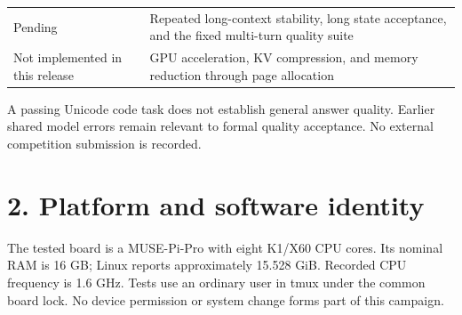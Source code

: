 \documentclass[10pt,a4paper]{article}
\begin{document}
\begin{longtable}[]{@{}ll@{}}
\begin{minipage}[t]{0.47\columnwidth}
Pending\strut
\end{minipage} & \begin{minipage}[t]{0.47\columnwidth}\raggedright
Repeated long-context stability, long state acceptance, and the fixed
multi-turn quality suite\strut
\end{minipage}\tabularnewline
\begin{minipage}[t]{0.47\columnwidth}\raggedright
Not implemented in this release\strut
\end{minipage} & \begin{minipage}[t]{0.47\columnwidth}\raggedright
GPU acceleration, KV compression, and memory reduction through page
allocation\strut
\end{minipage}\tabularnewline
\bottomrule
\end{longtable}

A passing Unicode code task does not establish general answer quality.
Earlier shared model errors remain relevant to formal quality
acceptance. No external competition submission is recorded.

\hypertarget{platform-and-software-identity}{%
\section{2. Platform and software
identity}\label{platform-and-software-identity}}

The tested board is a MUSE-Pi-Pro with eight K1/X60 CPU cores. Its
nominal RAM is 16 GB; Linux reports approximately 15.528 GiB. Recorded
CPU frequency is 1.6 GHz. Tests use an ordinary user in tmux under the
common board lock. No device permission or system change forms part of
this campaign.
\end{document}
